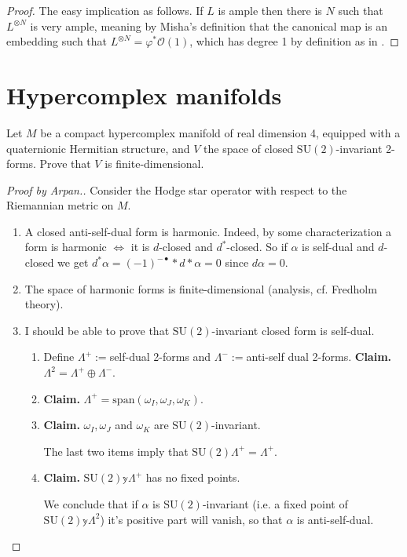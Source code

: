 \begin{proof}
The easy implication as follows. If $L$ is ample then there is $N$ such that
$L^{\otimes N}$ is very ample, meaning by Misha's definition that the canonical
map is an embedding such that $L^{\otimes N}=\varphi^*\mathcal{O}(1)$, which has
degree 1 by definition as in \cite[15.4.14]{sea}.
\end{proof}

\section{Hypercomplex manifolds}
\label{section-hypercomplex-manifolds}

\begin{exercise}
\label{exercise-SU2-invariant-forms}
Let $M$ be a compact hypercomplex manifold of real dimension 4, equipped with a
quaternionic Hermitian structure, and $V$ the space of closed
$\text{SU}(2)$-invariant 2-forms. Prove that $V$ is finite-dimensional.
\end{exercise}

\begin{proof}[Proof by Arpan.]
Consider the Hodge star operator with respect to the Riemannian metric on $M$.
\begin{enumerate}
\item A closed anti-self-dual form is harmonic. Indeed, by some 
characterization a
form is harmonic $\iff$ it is $d$-closed and $d^*$-closed. So if $\alpha$ is
self-dual and $d$-closed we get $d^*\alpha=(-1)^{-\bullet}*d*\alpha=0$ since
$d\alpha=0$.
\item The space of harmonic forms is finite-dimensional (analysis, cf. Fredholm
theory).
\item I should be able to prove that $\text{SU}(2)$-invariant closed form is
self-dual.
\begin{enumerate}
\item Define $\Lambda^+:=$self-dual 2-forms and $\Lambda^-:=$anti-self dual
2-forms. {\bf Claim.} $\Lambda^2=\Lambda^+ \oplus \Lambda^-$.
\item {\bf Claim.} $\Lambda^+=\text{span}(\omega_I,\omega_J,\omega_K)$.
\item {\bf Claim.} $\omega_I,\omega_J$ and $\omega_K$ are
$\text{SU}(2)$-invariant.

The last two items imply that $\text{SU}(2)\Lambda^+=\Lambda^+$.
\item {\bf Claim.} $\text{SU}(2)\mathbb{y}\Lambda^+$ has no fixed points.

We conclude that if $\alpha$ is $\text{SU}(2)$-invariant (i.e. a fixed point of
$\text{SU}(2)\mathbb{y}\Lambda^2$) it's positive part will vanish, so that
$\alpha$ is anti-self-dual.
\end{enumerate}
\end{enumerate}
\end{proof}

